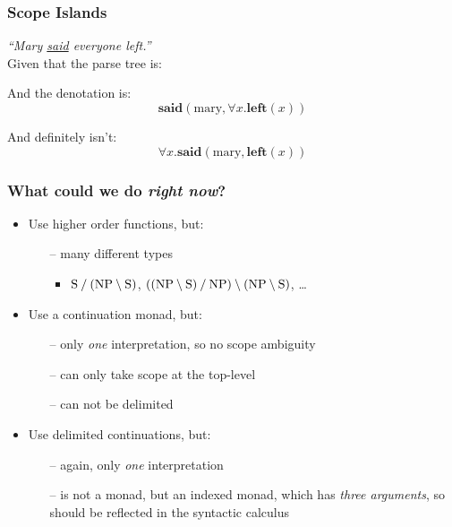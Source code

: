 \documentclass[12pt,t]{beamer}
\begin{document}
\begin{frame}[label=scope-islands]
  \frametitle{Scope Islands}
  \textit{``Mary \underline{said} everyone left.''}
  \\[0.125\baselineskip]
  Given that the parse tree is:
  \\[1\baselineskip]
  \begin{center}
  \end{center}
  \begin{minipage}{0.5\linewidth}
    And the denotation is:
    $$\mathbf{said}(\text{mary},\forall x.\mathbf{left}(x))$$
  \end{minipage}%
  \begin{minipage}{0.5\linewidth}
    And definitely isn't:
    $$\forall x.\mathbf{said}(\text{mary},\mathbf{left}(x))$$
  \end{minipage}
  \vfill
\end{frame}

\begin{frame}
  \frametitle{What could we do \textit{right now}?}
  \vfill
  \begin{itemize}
  \item
    Use higher order functions, but:
    \begin{itemize}
    \item[--] many different types
      \begin{itemize}
      \item
        $\text{S}\mathbin{\slash}(\text{NP}\mathbin{\backslash}\text{S})$,
        $((\text{NP}\mathbin{\backslash}\text{S})\mathbin{\slash}\text{NP})\mathbin{\backslash}(\text{NP}\mathbin{\backslash}\text{S})$,
        \ldots
      \end{itemize}
    \end{itemize}
  \item
    Use a continuation monad, but:
    \begin{itemize}
    \item[--] only \textit{one} interpretation, so no scope ambiguity
    \item[--] can only take scope at the top-level
    \item[--] can not be delimited
    \end{itemize}
  \item
    Use delimited continuations, but:
    \begin{itemize}
    \item[--] again, only \textit{one} interpretation
    \item[--] is not a monad, but an indexed monad, which has
      \textit{three arguments}, so should be reflected in the
      syntactic calculus
    \end{itemize}
  \end{itemize}
  \vfill
\end{frame}
\end{document}
